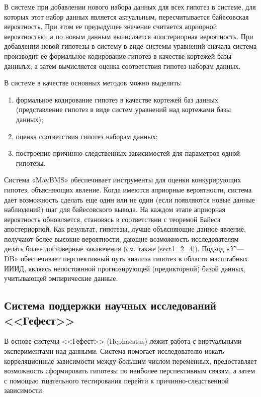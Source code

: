 В системе при добавлении нового набора данных для всех гипотез в системе, для которых этот набор данных является 
актуальным, пересчитывается байесовская вероятность. При этом ее предыдущее значение считается априорной вероятностью, 
а по новым данным вычисляется апостериорная вероятность. При добавлении новой гипотезы в систему в виде системы 
уравнений сначала система производит ее формальное кодирование гипотез в качестве кортежей базы данныъх, а затем 
вычисляется оценка соответствия гипотез наборам данных.

В системе в качестве основных методов можно выделить:
\begin{enumerate}
    \item формальное кодирование гипотез в качестве кортежей баз данных (представление гипотез в виде систем 
            уравнений над кортежами базы данных);
    \item оценка соответствия гипотез наборам данных;
    \item построение причинно-следственных зависимостей для параметров одной гипотезы.
\end{enumerate}

Система «MayBMS» обеспечивает инструменты для оценки конкурирующих гипотез, объясняющих явление. Когда имеются 
априорные вероятности, система дает возможность сделать еще один или не один (если появляются новые данные наблюдений) 
шаг для байесовского вывода. На каждом этапе априорная вероятность обновляется, становясь в соответствии с теоремой 
Байеса апостериорной. Как результат, гипотезы, лучше объясняющие данное явление, получают более высокие вероятности, 
дающие возможность исследователям делать более достоверные заключения (см. также \cref{sect1_2_4}). 
Подход «$\Upsilon$"---DB» обеспечивает перспективный путь анализа гипотез в области масштабных ИИИД, являясь 
непостоянной прогнозирующей (предикторной) базой данных, учитывающей эмпирические данные.


\subsection{Система поддержки научных исследований <<Гефест>>}\label{sect1_3_4}
В основе системы <<Гефест>> (Hephaestus) \cite{Duggan2015} лежит работа с виртуальными экспериментами над данными. 
Система помогает исследователю искать корреляционные зависимости между большим числом переменных, предоставляет 
возможность сформировать гипотезы по наиболее перспективным связям, а затем с помощью тщательного тестирования перейти 
к причинно-следственной зависимости. 

